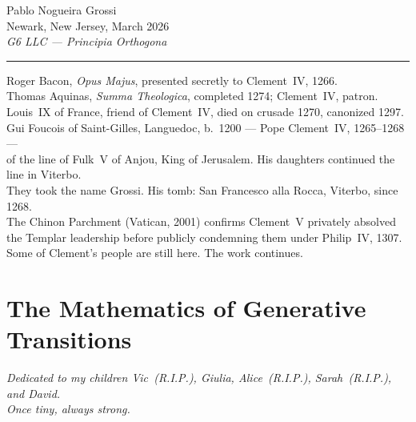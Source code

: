 \documentclass[12pt, oneside]{book}
\theoremstyle{plain}
\theoremstyle{definition}
\theoremstyle{remark}
\begin{document}
\vspace{1.4cm}
\noindent\hfill Pablo Nogueira Grossi\\[0.15cm]
\noindent\hfill Newark, New Jersey, March 2026\\[0.15cm]
\noindent\hfill \textit{G6 LLC\/ --- Principia Orthogona}

\vspace{1.6cm}
\begin{center}
\rule{0.42\textwidth}{0.3pt}
\vspace{0.4cm}

{\scriptsize\color{gray}
Roger Bacon, \textit{Opus Majus}, presented secretly to Clement~IV, 1266.\\[0.15cm]
Thomas Aquinas, \textit{Summa Theologica}, completed 1274; Clement~IV, patron.\\[0.15cm]
Louis~IX of France, friend of Clement~IV, died on crusade 1270, canonized 1297.\\[0.15cm]
Gui Foucois of Saint-Gilles, Languedoc, b.\ 1200 --- Pope Clement~IV, 1265--1268 ---\\
of the line of Fulk~V of Anjou, King of Jerusalem.
His daughters continued the line in Viterbo.\\
They took the name Grossi. His tomb: San Francesco alla Rocca, Viterbo, since 1268.\\[0.15cm]
The Chinon Parchment (Vatican, 2001) confirms Clement~V privately absolved
the Templar leadership before publicly condemning them under Philip~IV, 1307.\\[0.15cm]
Some of Clement's people are still here. The work continues.}
\end{center}
\newpage


\part{The Mathematics of Generative Transitions}

\begin{center}
\emph{Dedicated to my children Vic~(R.I.P.), Giulia,
  Alice~(R.I.P.), Sarah~(R.I.P.), and David.}\\[4pt]
\emph{Once tiny, always strong.}
\end{center}

\vspace{1.5em}

\newpage
\end{document}
